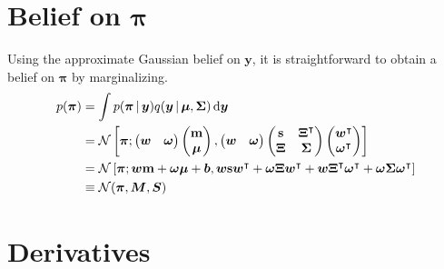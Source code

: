 \documentclass[a4paper]{article}
\newcommand{\bfm}{{\bf m}}
\newcommand{\bfs}{{\bf s}}
\newcommand{\N}{\mathcal{N}}
\newcommand{\T}{^{\top}}
\renewcommand{\vec}[1]{\boldsymbol{#1}}
\newcommand{\mat}[1]{\boldsymbol{#1}}
\newcommand{\bfmu}{\vec\mu}
\newcommand{\bfSig}{\mat{\Sigma}}
\newcommand{\bfM}{\vec{M}}
\newcommand{\bfS}{\mat{S}}
\newcommand{\bfy}{\vec{y}}
\newcommand{\bfpi}{\vec{\pi}}
\newcommand{\bfw}{\mat{w}}
\newcommand{\bfom}{\mat{\omega}}
\newcommand{\<}{\langle}
\renewcommand{\>}{\rangle}
\renewcommand{\d}{\,\mathrm{d}}
\renewcommand{\T}{^\intercal}%
\newcommand{\bfxi}{\mat{\Xi}}
\begin{document}
\section*{Belief on $\bfpi$}
\label{sec:belief-bfpi}

Using the approximate Gaussian belief on $\bfy$, it is straightforward
to obtain a belief on $\bfpi$ by marginalizing.
\begin{equation}
  \label{eq:6}
  \begin{aligned}
  p(\bfpi) &= \int p(\bfpi\,|\,\bfy) q(\bfy\,|\, \bfmu, \bfSig)
  \d \bfy \\
  &= \N\left[\bfpi;
  \begin{pmatrix}
    \bfw & \bfom
  \end{pmatrix}
  \begin{pmatrix}
    \bfm \\ \bfmu 
  \end{pmatrix}
,
\begin{pmatrix}
  \bfw & \bfom
\end{pmatrix}
\begin{pmatrix}
   \bfs & \bfxi\T \\ \bfxi & \bfSig
\end{pmatrix}
\begin{pmatrix}
  \bfw\T \\ \bfom\T
\end{pmatrix}
\right]\\
 &= \N\left[ \bfpi ;
     \bfw \bfm + \bfom \bfmu + \vec{b},
   \bfw \bfs \bfw\T + \bfom \bfxi \bfw\T + \bfw \bfxi\T \bfom\T +
   \bfom \bfSig \bfom\T
\right]\\
  &\equiv \N(\bfpi,\bfM,\bfS)
  \end{aligned}
\end{equation}

\section*{Derivatives}
\label{sec:derivatives}
\end{document}
